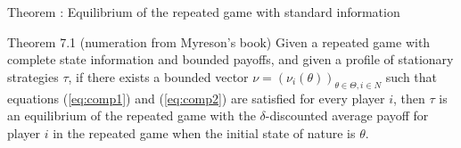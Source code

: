 \begin{frame}{Theorem : Equilibrium of the repeated game with standard information}
\begin{block}{Theorem 7.1 (numeration from Myreson's book)}
	Given a repeated game with complete state information and bounded payoffs, and given a profile of stationary strategies $\tau$, if there exists a bounded vector $\nu = (\nu_i(\theta))_{\theta \in \Theta, i \in N}$ such that equations (\ref{eq:comp1}) and (\ref{eq:comp2}) are satisfied for every player $i$, then $\tau$ is an equilibrium of the repeated game with the $\delta$-discounted average payoff for player $i$ in the repeated game when the initial state of nature is $\theta$.
\end{block}

\pause


\end{frame}

